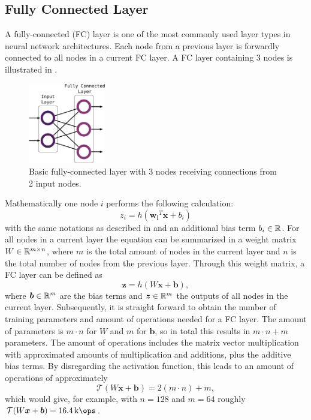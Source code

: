
\subsection{Fully Connected Layer}
A fully-connected (FC) layer is one of the most commonly used layer types in neural network architectures.
Each node from a previous layer is forwardly connected to all nodes in a current FC layer.
A FC layer containing 3 nodes is illustrated in .
\begin{figure}[!ht]
  \centering
    \includegraphics[width=0.30\textwidth]{./4_nn/figs/nn_theory_fc.pdf}
  \caption{Basic fully-connected layer with 3 nodes receiving connections from 2 input nodes.}
  \label{fig:nn_theory_fc}
\end{figure}
\FloatBarrier
\noindent
Mathematically one node $i$ performs the following calculation:
\begin{equation}\label{eq:nn_theory_fc_single}
  z_i = h(\bm{w_i}^T \bm{x} + b_i)
\end{equation}
with the same notations as described in  and an additional bias term $b_i \in \mathbb{R}$.
For all nodes in a current layer the equation  can be summarized in a weight matrix $W \in \mathbb{R}^{m \times n}$, where $m$ is the total amount of nodes in the current layer and $n$ is the total number of nodes from the previous layer.
Through this weight matrix, a FC layer can be defined as
\begin{equation}
  \bm{z} = h(W \bm{x} + \bm{b}),
\end{equation}
where $\bm{b} \in \mathbb{R}^m$ are the bias terms and $\bm{z} \in \mathbb{R}^m$ the outputs of all nodes in the current layer.
Subsequently, it is straight forward to obtain the number of training parameters and amount of operations needed for a FC layer.
The amount of parameters is $m \cdot n$ for $W$ and $m$ for $\bm{b}$, so in total this results in $m \cdot n + m$ parameters.
The amount of operations includes the matrix vector multiplication with approximated amounts of multiplication and additions, plus the additive bias terms.
By disregarding the activation function, this leads to an amount of operations of approximately
\begin{equation} 
  \mathcal{T}(W \bm{x} + \bm{b}) = 2 (m \cdot n) + m,
\end{equation}
which would give, for example, with $n = 128$ and $m = 64$ roughly $\mathcal{T}(W \bm{x} + \bm{b}) = \SI{16.4}{\kilo\ops}$.


